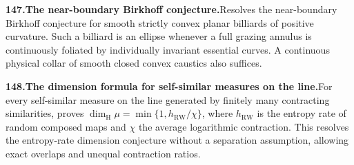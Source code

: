 \documentclass[11pt,a4paper]{article}
\begin{document}
  \par \begin{minipage}{\linewidth}
  \fontsize{10.5}{12.6}\selectfont\RaggedRight
  \hypertarget{result 147}{}
  {\bfseries\textcolor{muted}{147.}\enspace The near-boundary Birkhoff conjecture.}\enspace Resolves the near-boundary Birkhoff conjecture for smooth strictly convex planar billiards of positive curvature. Such a billiard is an ellipse whenever a full grazing annulus is continuously foliated by individually invariant essential curves. A continuous physical collar of smooth closed convex caustics also suffices.\par
  \end{minipage}\par\vspace{5pt}



  \par \begin{minipage}{\linewidth}
  \fontsize{10.5}{12.6}\selectfont\RaggedRight
  \hypertarget{result 148}{}
  {\bfseries\textcolor{muted}{148.}\enspace The dimension formula for self-similar measures on the line.}\enspace For every self-similar measure on the line generated by finitely many contracting similarities, proves $\dim_{\mathrm H}\mu=\min\{1,h_{\mathrm{RW}}/\chi\}$, where $h_{\mathrm{RW}}$ is the entropy rate of random composed maps and $\chi$ the average logarithmic contraction. This resolves the entropy-rate dimension conjecture without a separation assumption, allowing exact overlaps and unequal contraction ratios.\par
  \end{minipage}\par\vspace{5pt}
\end{document}
